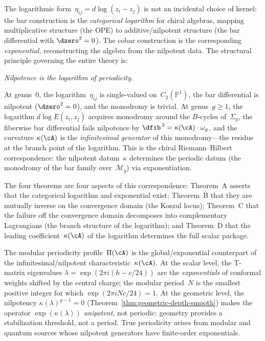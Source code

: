 \begin{remark}
\label{rem:nilpotence-periodicity}
The logarithmic form~$\eta_{ij} = d\log(z_i - z_j)$ is not an
incidental choice of kernel: the bar construction is the
\emph{categorical logarithm} for chiral algebras, mapping
multiplicative structure (the OPE) to additive/nilpotent structure
(the bar differential with $\dzero^2 = 0$).  The cobar construction
is the corresponding \emph{exponential}, reconstructing the algebra
from the nilpotent data.  The structural principle governing the
entire theory is:
\begin{center}
\emph{Nilpotence is the logarithm of periodicity.}
\end{center}
At genus~$0$, the logarithm~$\eta_{ij}$ is single-valued
on~$C_2(\mathbb{P}^1)$, the bar differential is nilpotent
($\dzero^2 = 0$), and the monodromy is trivial.  At
genus~$g \geq 1$, the logarithm $d\log E(z_i,z_j)$ acquires
monodromy around the $B$-cycles of~$\Sigma_g$, the fiberwise bar
differential fails nilpotence by
$\dfib^{\,2} = \kappa(\cA)\cdot\omega_g$, and the curvature
$\kappa(\cA)$ is the \emph{infinitesimal generator} of this
monodromy---the residue at the branch point of the logarithm.
This is the chiral Riemann--Hilbert correspondence: the nilpotent
datum~$\kappa$ determines the periodic datum (the monodromy of the
bar family over~$\overline{\mathcal{M}}_g$) via exponentiation.

The four theorems are four aspects of this correspondence:
Theorem~A asserts that the categorical logarithm and exponential
exist; Theorem~B that they are mutually inverse on the
convergence domain (the Koszul locus); Theorem~C that the failure
off the convergence domain decomposes into complementary
Lagrangians (the branch structure of the logarithm); and
Theorem~D that the leading coefficient~$\kappa(\cA)$ of the
logarithm determines the full scalar package.

The modular periodicity profile~$\Pi(\cA)$ is the
global/exponential counterpart of the infinitesimal/nilpotent
characteristic~$\kappa(\cA)$.  At the scalar level, the T-matrix
eigenvalues $\lambda = \exp(2\pi i(h - c/24))$ are the
\emph{exponentials} of conformal weights shifted by the central
charge; the modular period~$N$ is the smallest positive integer for
which $\exp(2\pi i N c/24) = 1$.  At the geometric level, the
nilpotency $\kappa(\lambda)^{g-1} = 0$
(Theorem~\ref{thm:geometric-depth-smooth}) makes the operator
$\exp(\kappa(\lambda))$ \emph{unipotent}, not periodic: geometry
provides a stabilization threshold, not a period.  True periodicity
arises from modular and quantum sources whose nilpotent generators
have finite-order exponentials.
\end{remark}

